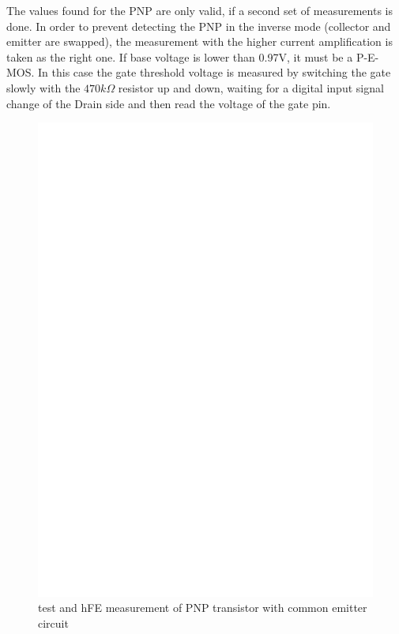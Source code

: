 The values found for the PNP are only valid, if a second
set of measurements is done. In order to prevent detecting the PNP in the inverse mode
(collector and emitter are swapped), the measurement with the higher current amplification is taken as
the right one.
If base voltage is lower than 0.97V, it must be a P-E-MOS. In this case the gate threshold voltage is measured
by switching the gate slowly with the \(470k\Omega\) resistor up and down, waiting for a digital
input signal change of the Drain side and then read the voltage of the gate pin.
\begin{figure}[H]
\centering
\includegraphics[]{../FIG/PNPce.eps}
\caption{test and hFE measurement of PNP transistor with common emitter circuit }
\label{fig:pnpce}
\end{figure}

